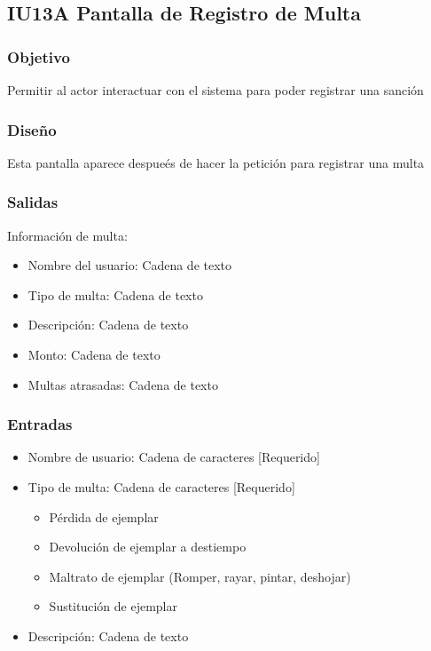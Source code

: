\newpage
\subsection{IU13A Pantalla de Registro de Multa}

\subsubsection{Objetivo}
	Permitir al actor interactuar con el sistema para poder registrar una sanción 

\subsubsection{Diseño}
	Esta pantalla aparece despueés de hacer la petición para registrar una multa


\subsubsection{Salidas}
	\begin{Citemize}
	        \item Información de multa:
	        \begin{itemize}
	        	\item Nombre del usuario: Cadena de texto
	        	\item Tipo de multa: Cadena de texto
		       	\item Descripción: Cadena de texto
		   		\item Monto: Cadena de texto
	    		\item Multas atrasadas: Cadena de texto
	       	\end{itemize}
	\end{Citemize}
	
\subsubsection{Entradas}
		\begin{itemize}
        	\item Nombre de usuario: Cadena de caracteres [Requerido]
        	\item Tipo de multa: Cadena de caracteres [Requerido]
        		\begin{itemize}
        			\item Pérdida de ejemplar
        			\item Devolución de ejemplar a destiempo
        			\item Maltrato de ejemplar (Romper, rayar, pintar, deshojar)
        			\item Sustitución de ejemplar
        		\end{itemize} 
	        \item Descripción: Cadena de texto
        \end{itemize}  
